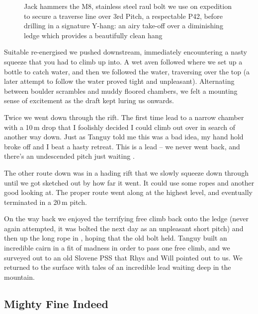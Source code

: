  
 \begin{figure}[t!]
\checkoddpage \ifoddpage \forcerectofloat \else \forceversofloat \fi
\centering
{}
\caption{Jack hammers the M8, stainless steel raul bolt we use on expedition to secure a traverse line over \protect{} 3rd Pitch, a respectable P42, before drilling in a signature Y-hang: an airy take-off over a diminishing ledge which provides a beautifully clean hang }
\label{bolt M8}
\end{figure}

Suitable re-energised we pushed downstream, immediately encountering a nasty squeeze that you had to climb up into. A wet aven followed where we set up a bottle to catch water, and then we followed the water, traversing over the top (a later attempt to follow the water proved tight and unpleasant). Alternating between boulder scrambles and muddy floored chambers, we felt a mounting sense of excitement as the draft kept luring us onwards.
 
Twice we went down through the rift. The first time lead to a narrow chamber with a 10\,m drop that I foolishly decided I could climb out over in search of another way down. Just as Tanguy told me this was a bad idea, my hand hold broke off and I beat a hasty retreat. This is a lead -- we never went back, and there's an undescended pitch just waiting .
 
The other route down was in a hading rift that we slowly squeeze down through until we got sketched out by how far it went. It could use some ropes and another good looking at. The proper route went along at the highest level, and eventually terminated in a 20\,m pitch.
 
On the way back we enjoyed the terrifying free climb back onto the ledge (never again attempted, it was bolted the next day as an unpleasant short pitch) and then up the long rope in , hoping that the old bolt held. Tanguy built an incredible cairn in a fit of madness in order to pass one free climb, and we surveyed out to an old Slovene PSS that Rhys and Will pointed out to us. We returned to the surface with tales of an incredible lead waiting deep in the mountain.

\subsection{Mighty Fine Indeed}
    
